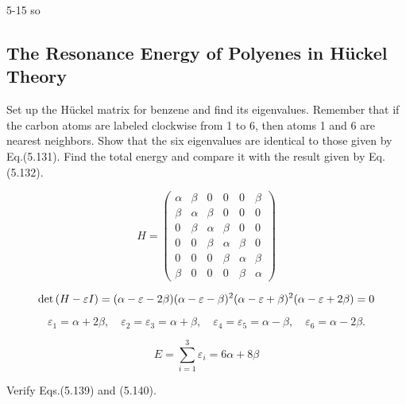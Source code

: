 \documentclass[a4paper]{book}
\renewcommand\det[1]{{\rm det}\left(#1\right)}
\begin{document}
	\begin{solution}
		5-15 so
	\end{solution}
	
	\subsection{The Resonance Energy of Polyenes in H{\"u}ckel Theory}
	
	\begin{exercise}
	Set up the H{\"u}ckel matrix for benzene and find its eigenvalues. Remember that if the carbon atoms are labeled clockwise from 1 to 6, then atoms 1 and 6 are nearest neighbors. Show that the six eigenvalues are identical to those given by Eq.(5.131). Find the total energy and compare it with the result given by Eq.(5.132).
	\end{exercise}
	
	\begin{solution}
	
	\[
		H = \begin{pmatrix}
		\alpha	& \beta	&	0	&	0	&	0	& \beta \\
		\beta	& \alpha& \beta & 	0	& 	0 	& 0   	\\
		0		& \beta	& \alpha& \beta	& 	0 	& 0   	\\
		0		&	0	& \beta	& \alpha& \beta	& 0   	\\
		0		&	0	& 	0	& \beta	& \alpha& \beta	\\
		\beta	&	0	& 	0	&	0	& \beta	& \alpha
		\end{pmatrix}
	\]	
	
	\[
		\det{H - \varepsilon I} = ( \alpha - \varepsilon - 2\beta ) ( \alpha - \varepsilon - \beta )^2 ( \alpha - \varepsilon + \beta )^2 ( \alpha - \varepsilon + 2\beta ) = 0
	\]	
	
	\[
		\varepsilon_1 = \alpha + 2 \beta , \quad \varepsilon_2 = \varepsilon_3 = \alpha + \beta , \quad \varepsilon_4 = \varepsilon_5 = \alpha - \beta , \quad \varepsilon_6 = \alpha - 2 \beta .
	\]
	
	\begin{equation}
		E = \sum_{i=1}^3 \varepsilon_i = 6 \alpha + 8 \beta
	\end{equation}
	
	\end{solution}
	
	\begin{exercise}
	Verify Eqs.(5.139) and (5.140).
	\end{exercise}
	
\end{document}

